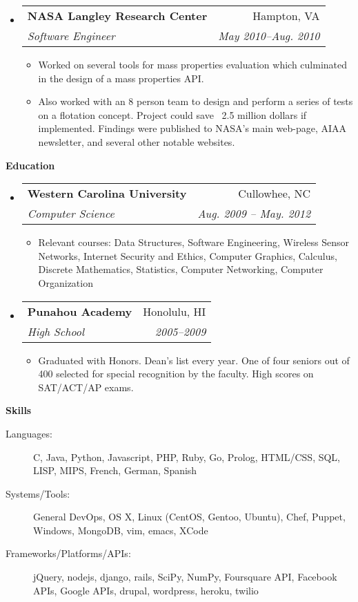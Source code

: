 \documentclass[letterpaper,11pt]{article}
\makeatletter
\newcommand{\resitem}[1]{\item #1 \vspace{-2pt}}
\newcommand{\resheading}[1]{{\large \colorbox{mygrey}{\begin{minipage}{\textwidth}{\textbf{#1 \vphantom{p\^{E}}}}\end{minipage}}}}
\newcommand{\ressubheading}[4]{
\begin{tabular*}{7.0in}{l@{\extracolsep{\fill}}r}
		\textbf{#1} & #2 \\
		\textit{#3} & \textit{#4} \\
\end{tabular*}\vspace{-6pt}}
\makeatother
\begin{document}
\begin{itemize}
\begin{itemize}
   \end{itemize}
\item
   \ressubheading{NASA Langley Research Center}{Hampton, VA}{Software Engineer}{May 2010--Aug. 2010}
      \begin{itemize}
         \resitem{Worked on several tools for mass properties evaluation which culminated in the design of a mass properties API.} 
         \resitem{Also worked with an 8 person team to design and perform a series of tests on a flotation concept. Project could save ~2.5 million dollars if implemented. Findings were published to NASA's main web-page, AIAA newsletter, and several other notable websites.}
      \end{itemize}
\end{itemize}
\resheading{Education}
\begin{itemize}
\item
   \ressubheading{Western Carolina University}{Cullowhee, NC}{Computer Science}{Aug. 2009 -- May. 2012}
   \begin{itemize}
      \resitem{Relevant courses: Data Structures, Software Engineering, Wireless Sensor Networks, Internet Security and Ethics, Computer Graphics, Calculus, Discrete Mathematics, Statistics, Computer Networking, Computer Organization}
   \end{itemize}
\item
   \ressubheading{Punahou Academy}{Honolulu, HI}{High School}{2005--2009}
   \begin{itemize}
      \resitem{Graduated with Honors. Dean's list every year. One of four seniors out of 400 selected for special recognition by the faculty. High scores on SAT/ACT/AP exams.}
   \end{itemize}
\end{itemize}
\pagebreak
\resheading{Skills}
\begin{description}
\item[Languages:]
C, Java, Python, Javascript, PHP, Ruby, Go, Prolog, HTML/CSS, SQL, LISP, MIPS, French, German, Spanish
\item[Systems/Tools:]
General DevOps, OS X, Linux (CentOS, Gentoo, Ubuntu), Chef, Puppet, Windows, MongoDB, vim, emacs, XCode
\item[Frameworks/Platforms/APIs:]
jQuery, nodejs, django, rails, SciPy, NumPy, Foursquare API, Facebook APIs, Google APIs, drupal, wordpress, heroku, twilio
\end{description}
\end{document}
